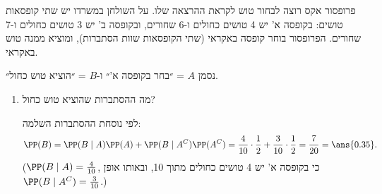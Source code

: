 פרופסור אקס רוצה לבחור טוש לקראת ההרצאה שלו. על השולחן במשרדו יש שתי קופסאות טושים: בקופסה א' יש 4 טושים כחולים ו-6 שחורים, ובקופסה ב' יש 3 טושים כחולים ו-7 שחורים. הפרופסור בוחר קופסה באקראי (שתי הקופסאות שוות הסתברות), ומוציא ממנה טוש באקראי.
\begin{solbox}
נסמן $A$ = ״בחר בקופסה א'״ ו-$B$ = ״הוציא טוש כחול״.
\end{solbox}
\begin{enumerate}
\item מה ההסתברות שהוציא טוש כחול?
\begin{solbox}
לפי נוסחת ההסתברות השלמה:
\[
\PP(B)=\PP(B\mid A)\PP(A)+\PP(B\mid A^C)\PP(A^C)=\frac4{10}\cdot\frac12+\frac3{10}\cdot\frac12=\frac7{20}=\ans{0.35}.
\]
($\PP(B\mid A)=\frac4{10}$, כי בקופסה א' יש 4 טושים כחולים מתוך 10, ובאותו אופן $\PP(B\mid A^C)=\frac3{10}$.)


\end{solbox}
\end{enumerate}
